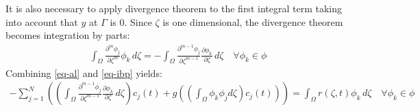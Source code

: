 It is also necessary to apply divergence theorem to the first integral term taking into account that \(y\) at \(\Gamma\) is 0.
Since \(\zeta\) is one dimensional, the divergence theorem becomes integration by parts:
\begin{gather}
\int_{\Omega} \frac{\partial^{m} \phi_{j}}{\partial \zeta^{m}} \phi_{k} \, d\zeta = - \int_{\Omega} \frac{\partial^{m-1} \phi_{j}}{\partial \zeta^{m-1}} \frac{\partial \phi_{k}}{\partial \zeta} \, d\zeta \quad \forall \phi_{k} \in \phi \label{eq-ibp}
\end{gather}
Combining \ref{eq-al} and \ref{eq-ibp} yields:
\begin{gather}
-\sum_{j = 1}^{N} ((\int_{\Omega} \frac{\partial^{m-1} \phi_{j}}{\partial \zeta^{m-1}} \frac{\partial \phi_{k}}{\partial \zeta} \, d\zeta) c_{j}(t) + g((\int_{\Omega} \phi_k \phi_j d\zeta) c_{j}(t)))  = \int_{\Omega}  r(\zeta, t) \phi_{k}        \, d\zeta \quad \forall \phi_{k} \in \phi \label{eq-fem}
\end{gather}

